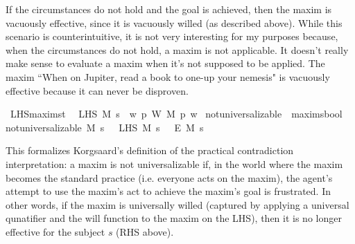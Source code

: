 \begin{isabellebody}
\begin{isamarkuptext}
If the circumstances do not hold and the goal is achieved, then the maxim is vacuously effective, since 
it is vacuously willed (as described above). While this scenario is counterintuitive, it is not very 
interesting for my purposes because, when the circumstances do not hold, a maxim is not applicable. It 
doesn't really make sense to evaluate a maxim when it's not supposed to be applied. The maxim ``When on Jupiter,
read a book to one-up your nemesis" is vacuously effective because it can never be disproven.%
\end{isamarkuptext}\isamarkuptrue%
\isamarkupfalse%
\ LHS{\isacharcolon}{\isacharcolon}{\isachardoublequoteopen}maxim{\isasymRightarrow}s{\isasymRightarrow}t{\isachardoublequoteclose}\ \ \isanewline
{\isachardoublequoteopen}LHS\ M\ s\ {\isacharequal}\ {\isacharparenleft}{\isasymlambda}w{\isachardot}\ {\isacharparenleft}{\isasymforall}p{\isachardot}\ W\ M\ p\ w{\isacharparenright}{\isacharparenright}{\isachardoublequoteclose}\isanewline
\isanewline
{}\isamarkupfalse%
\ not{\isacharunderscore}universalizable\ {\isacharcolon}{\isacharcolon}\ {\isachardoublequoteopen}maxim{\isasymRightarrow}s{\isasymRightarrow}bool{\isachardoublequoteclose}\ \ \isanewline
{\isachardoublequoteopen}not{\isacharunderscore}universalizable\ M\ s\ {\isacharequal}\ {\isacharparenleft}{\isasymTurnstile}\ {\isacharparenleft}LHS\ M\ s\ \isactrlbold {\isasymrightarrow}\ {\isacharparenleft}\isactrlbold {\isasymnot}\ {\isacharparenleft}E\ M\ s{\isacharparenright}{\isacharparenright}{\isacharparenright}{\isacharparenright}{\isachardoublequoteclose}\isanewline
%
\isanewline
{}\isamarkupfalse%
%
\begin{isamarkuptext}%
This formalizes Korgsaard's definition of the practical contradiction
interpretation:  a maxim is not universalizable 
if, in the world where the maxim becomes the standard practice (i.e. everyone acts on the maxim), the
agent's attempt to use the maxim's act to achieve the maxim's goal is frustrated. In other words, if 
the maxim is universally willed (captured by applying a universal qunatifier and the will function 
to the maxim on the LHS), then it is no longer effective for the subject $s$ (RHS above). 


\end{isamarkuptext}
\end{isabellebody}
